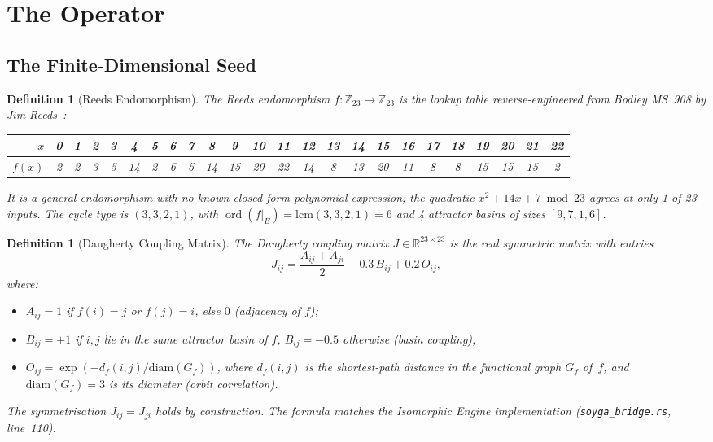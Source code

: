 \documentclass[11pt,a4paper]{article}
\theoremstyle{plain}
\newtheorem{definition}[theorem]{Definition}
\theoremstyle{remark}
\newcommand{\Z}{\mathbb{Z}}
\newcommand{\R}{\mathbb{R}}
\newcommand{\ord}{\operatorname{ord}}
\begin{document}
\section{The Operator}
\label{sec:operator}

\subsection{The Finite-Dimensional Seed}
\label{sec:seed}

\begin{definition}[Reeds Endomorphism]\label{def:reeds}
The \emph{Reeds endomorphism} $f\colon\Z_{23}\to\Z_{23}$ is the lookup table
reverse-engineered from Bodley MS~908 by Jim Reeds~\cite{reeds2006}:

\begin{center}\small
\setlength{\tabcolsep}{3.6pt}
\begin{tabular}{r|*{23}{c}}
\toprule
$x$    & 0 & 1 & 2 & 3 & 4 & 5 & 6 & 7 & 8 & 9 &10 &11 &12 &13 &14 &15 &16 &17 &18 &19 &20 &21 &22\\
\midrule
$f(x)$ & 2 & 2 & 3 & 5 &14 & 2 & 6 & 5 &14 &15 &20 &22 &14 & 8 &13 &20 &11 & 8 & 8 &15 &15 &15 & 2\\
\bottomrule
\end{tabular}
\end{center}

\noindent It is a general endomorphism with no known closed-form polynomial
expression; the quadratic $x^2+14x+7\bmod 23$ agrees at only 1 of 23 inputs.
The cycle type is $(3,3,2,1)$, with
$\ord(f|_E)=\mathrm{lcm}(3,3,2,1)=6$ and 4 attractor basins of sizes
$[9,7,1,6]$.
\end{definition}

\begin{definition}[Daugherty Coupling Matrix]\label{def:coupling}
The \emph{Daugherty coupling matrix} $J\in\R^{23\times 23}$ is the real
symmetric matrix with entries
\begin{equation}\label{eq:coupling}
  J_{ij} = \frac{A_{ij}+A_{ji}}{2} + 0.3\,B_{ij} + 0.2\,O_{ij},
\end{equation}
where:
\begin{itemize}[nosep]
  \item $A_{ij}=1$ if $f(i)=j$ or $f(j)=i$, else $0$
        \emph{(adjacency of $f$)};
  \item $B_{ij}=+1$ if $i,j$ lie in the same attractor basin of $f$,
        $B_{ij}=-0.5$ otherwise \emph{(basin coupling)};
  \item $O_{ij}=\exp(-d_f(i,j)/\mathrm{diam}(G_f))$, where $d_f(i,j)$
        is the shortest-path distance in the functional graph $G_f$
        of~$f$, and $\mathrm{diam}(G_f)=3$ is its diameter
        \emph{(orbit correlation)}.
\end{itemize}
The symmetrisation $J_{ij}=J_{ji}$ holds by construction.  The formula
matches the Isomorphic Engine implementation
(\texttt{soyga\_bridge.rs}, line~110).
\end{definition}
\end{document}
